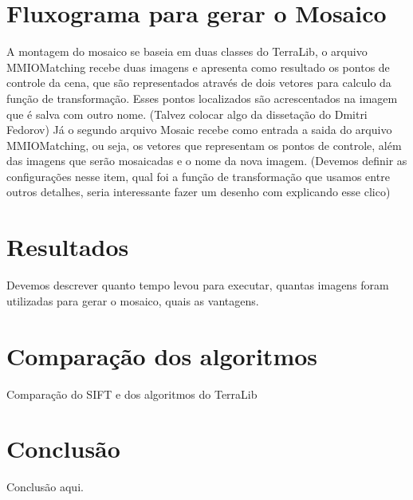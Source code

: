 \documentclass[9pt, a4paper, nofonttune, journal]{IEEEtran}
\begin{document}
\section{ Fluxograma para gerar o Mosaico}
 A montagem do mosaico se baseia em duas classes do TerraLib, o arquivo MMIOMatching recebe duas imagens e apresenta como resultado os pontos de controle da cena, que são representados através de dois vetores para calculo da função de transformação. Esses pontos localizados são acrescentados na imagem que é salva com outro nome.
(Talvez colocar algo da dissetação do Dmitri Fedorov)
 Já o segundo arquivo  Mosaic recebe como entrada  a saida do  arquivo MMIOMatching, ou seja, os vetores  que representam os pontos de controle, além das imagens que serão mosaicadas e o nome da nova imagem.
(Devemos definir as configurações nesse item, qual foi a função de transformação que usamos entre outros detalhes, seria interessante fazer um desenho com explicando esse clico)

\section{Resultados}
Devemos descrever quanto tempo levou para executar, quantas imagens foram utilizadas para gerar o mosaico, quais as vantagens. 

\section{Comparação dos algoritmos}
Comparação do SIFT e dos algoritmos do TerraLib

\section{Conclusão}
Conclusão aqui.



\end{document}
